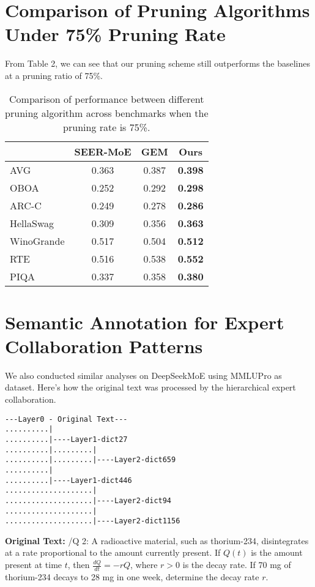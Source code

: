 \documentclass[11pt]{article}
\begin{document}
\section{Comparison of Pruning Algorithms Under 75\% Pruning Rate}
From Table 2, we can see that our pruning scheme still outperforms the baselines at a pruning ratio of 75\%.
\begin{table}[h]
\centering
\begin{tabular}{l|ccc}
\toprule
         & \textbf{SEER-MoE} & \textbf{GEM} & \textbf{Ours} \\
\midrule
AVG        & 0.363  & 0.387  & \textbf{0.398} \\
OBOA       & 0.252  & 0.292  & \textbf{0.298} \\
ARC-C      & 0.249  & 0.278  & \textbf{0.286} \\
HellaSwag  & 0.309  & 0.356  & \textbf{0.363} \\
WinoGrande & 0.517  & 0.504  & \textbf{0.512} \\
RTE        & 0.516  & 0.538  & \textbf{0.552} \\
PIQA       & 0.337  & 0.358  & \textbf{0.380} \\
\bottomrule
\end{tabular}
\caption{Comparison of  performance between different pruning algorithm across benchmarks when the pruning rate is 75\%.}
\end{table}

\section{Semantic Annotation for Expert Collaboration Patterns}

We also conducted similar analyses on DeepSeekMoE using MMLUPro as dataset. Here's how the original text was processed by the hierarchical expert collaboration.

\newpage


\begin{verbatim}
---Layer0 - Original Text---
..........|   
..........|----Layer1-dict27  
..........|.........|   
..........|.........|----Layer2-dict659  
..........|   
..........|----Layer1-dict446   
....................|   
....................|----Layer2-dict94  
....................|   
....................|----Layer2-dict1156
\end{verbatim}

\medskip

\noindent
\textbf{Original Text:}
/Q 2: A radioactive material, such as thorium-234, disintegrates at a rate proportional to the amount currently present. If $Q(t)$ is the amount present at time $t$, then $\frac{dQ}{dt} = -rQ$, where $r> 0$ is the decay rate. If 70 mg of thorium-234 decays to 28 mg in one week, determine the decay rate $r$.
\end{document}
